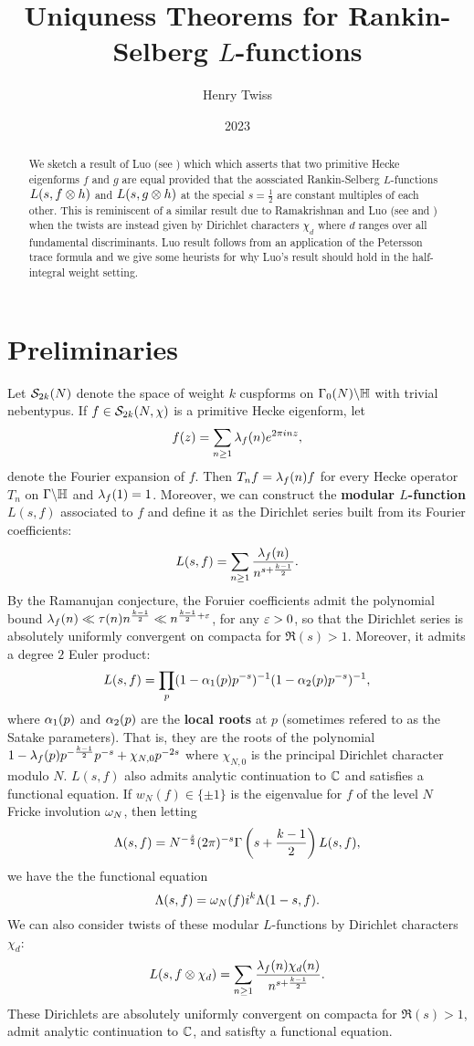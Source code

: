 \documentclass[12pt,reqno,oneside]{amsart}
\title{Uniquness Theorems for Rankin-Selberg \texorpdfstring{$L$}{L}-functions}
\author{Henry Twiss}
\date{2023}
\begin{document}
\begin{abstract}
    We sketch a result of Luo (see \cite{L}) which which asserts that two primitive Hecke eigenforms $f$ and $g$ are equal provided that the aossciated Rankin-Selberg $L$-functions $L(s,f \otimes h)$ and $L(s,g \otimes h)$ at the special $s = \frac{1}{2}$ are constant multiples of each other. This is reminiscent of a similar result due to Ramakrishnan and Luo (see \cite{LR-1} and \cite{LR-2}) when the twists are instead given by Dirichlet characters $\chi_{d}$ where $d$ ranges over all fundamental discriminants. Luo result follows from an application of the Petersson trace formula and we give some heurists for why Luo's result should hold in the half-integral weight setting.
\end{abstract}

\maketitle

\section{Preliminaries}
    Let $\mathcal{S}_{2k}(N)$ denote the space of weight $k$ cuspforms on $\Gamma_{0}(N)\backslash\mathbb{H}$ with trivial nebentypus. If $f \in \mathcal{S}_{2k}(N,\chi)$ is a primitive Hecke eigenform, let
    \[
        f(z) = \sum_{n \ge 1}\lambda_{f}(n)e^{2\pi inz},
    \]
    denote the Fourier expansion of $f$. Then $T_{n}f = \lambda_{f}(n)f$ for every Hecke operator $T_{n}$ on $\Gamma\backslash\mathbb{H}$ and $\lambda_{f}(1) = 1$. Moreover, we can construct the \textbf{modular $L$-function} $L(s,f)$ associated to $f$ and define it as the Dirichlet series built from its Fourier coefficients:
    \[
        L(s,f) = \sum_{n \ge 1}\frac{\lambda_{f}(n)}{n^{s+\frac{k-1}{2}}}.
    \]
    By the Ramanujan conjecture, the Foruier coefficients admit the polynomial bound $\lambda_{f}(n) \ll \tau(n)n^{\frac{k-1}{2}} \ll n^{\frac{k-1}{2}+\varepsilon}$, for any $\varepsilon > 0$, so that the Dirichlet series is absolutely uniformly convergent on compacta for $\Re(s) > 1$. Moreover, it admits a degree $2$ Euler product:
    \[
        L(s,f) = \prod_{p}(1-\alpha_{1}(p)p^{-s})^{-1}(1-\alpha_{2}(p)p^{-s})^{-1},
    \]
    where $\alpha_{1}(p)$ and $\alpha_{2}(p)$ are the \textbf{local roots} at $p$ (sometimes refered to as the Satake parameters). That is, they are the roots of the polynomial $1-\lambda_{f}(p)p^{-\frac{k-1}{2}}p^{-s}+\chi_{N,0}p^{-2s}$ where $\chi_{N,0}$ is the principal Dirichlet character modulo $N$. $L(s,f)$ also admits analytic continuation to $\mathbb{C}$ and satisfies a functional equation. If $w_{N}(f) \in \{\pm 1\}$ is the eigenvalue for $f$ of the level $N$ Fricke involution $\omega_{N}$, then letting
    \[
        \Lambda(s,f) = N^{-\frac{s}{2}}(2\pi)^{-s}\Gamma\left(s+\frac{k-1}{2}\right)L(s,f),
    \]
    we have the the functional equation
    \[
        \Lambda(s,f) = \omega_{N}(f)i^{k}\Lambda(1-s,f).
    \]
    We can also consider twists of these modular $L$-functions by Dirichlet characters $\chi_{d}$:
    \[
        L(s,f \otimes \chi_{d}) = \sum_{n \ge 1}\frac{\lambda_{f}(n)\chi_{d}(n)}{n^{s+\frac{k-1}{2}}}.
    \]
    These Dirichlets are absolutely uniformly convergent on compacta for $\Re(s) > 1$, admit analytic continuation to $\mathbb{C}$, and satisfty a functional equation.
\end{document}

